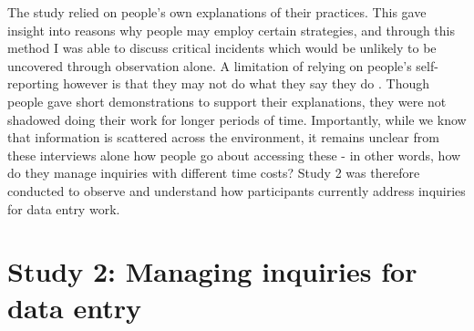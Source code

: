 The study relied on people's own explanations of their practices. This gave insight into reasons why people may employ certain strategies, and through this method I was able to discuss critical incidents which would be unlikely to be uncovered through observation alone. A limitation of relying on people's self-reporting however is that they may not do what they say they do \citep[e.g.][]{Randall2014}. Though people gave short demonstrations to support their explanations, they were not shadowed doing their work for longer periods of time. Importantly, while we know that information is scattered across the environment, it remains unclear from these interviews alone how people go about accessing these - in other words, how do they manage inquiries with different time costs? Study 2 was therefore conducted to observe and understand how participants currently address inquiries for data entry work.


\newpage

\section{Study 2: Managing inquiries for data entry}\label{st:Study2}

